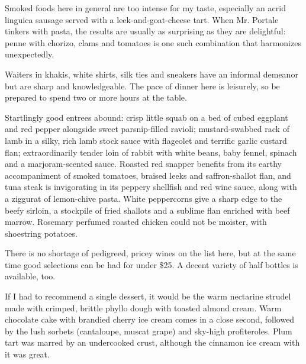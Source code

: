 Smoked foods here in general are too intense for my taste, especially an
acrid linguica sausage served with a leek-and-goat-cheese tart. When Mr.
Portale tinkers with pasta, the results are usually as surprising as
they are delightful: penne with chorizo, clams and tomatoes is one such
combination that harmonizes unexpectedly.

Waiters in khakis, white shirts, silk ties and sneakers have an informal
demeanor but are sharp and knowledgeable. The pace of dinner here is
leisurely, so be prepared to spend two or more hours at the table.

Startlingly good entrees abound: crisp little squab on a bed of cubed
eggplant and red pepper alongside sweet parsnip-filled ravioli;
mustard-swabbed rack of lamb in a silky, rich lamb stock sauce with
flageolet and terrific garlic custard flan; extraordinarily tender loin
of rabbit with white beans, baby fennel, spinach and a marjoram-scented
sauce. Roasted red snapper benefits from its earthy accompaniment of
smoked tomatoes, braised leeks and saffron-shallot flan, and tuna steak
is invigorating in its peppery shellfish and red wine sauce, along with
a ziggurat of lemon-chive pasta. White peppercorns give a sharp edge to
the beefy sirloin, a stockpile of fried shallots and a sublime flan
enriched with beef marrow. Rosemary perfumed roasted chicken could not
be moister, with shoestring potatoes.

There is no shortage of pedigreed, pricey wines on the list here, but at
the same time good selections can be had for under \$25. A decent
variety of half bottles is available, too.

If I had to recommend a single dessert, it would be the warm nectarine
strudel made with crimped, brittle phyllo dough with toasted almond
cream. Warm chocolate cake with brandied cherry ice cream comes in a
close second, followed by the lush sorbets (cantaloupe, muscat grape)
and sky-high profiteroles. Plum tart was marred by an undercooked crust,
although the cinnamon ice cream with it was great.

